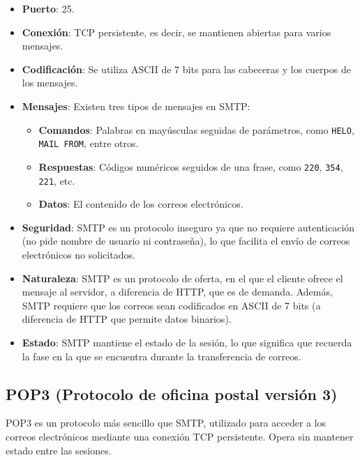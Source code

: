 \documentclass{article}
\begin{document}
\begin{itemize}
    \item \textbf{Puerto}: 25.
    \item \textbf{Conexión}: TCP persistente, es decir, se mantienen abiertas para varios mensajes.
    \item \textbf{Codificación}: Se utiliza ASCII de 7 bits para las cabeceras y los cuerpos de los mensajes.
    \item \textbf{Mensajes}: Existen tres tipos de mensajes en SMTP:
    \begin{itemize}
        \item \textbf{Comandos}: Palabras en mayúsculas seguidas de parámetros, como \texttt{HELO}, \texttt{MAIL FROM}, entre otros.
        \item \textbf{Respuestas}: Códigos numéricos seguidos de una frase, como \texttt{220}, \texttt{354}, \texttt{221}, etc.
        \item \textbf{Datos}: El contenido de los correos electrónicos.
    \end{itemize}
    \item \textbf{Seguridad}: SMTP es un protocolo inseguro ya que no requiere autenticación (no pide nombre de usuario ni contraseña), lo que facilita el envío de correos electrónicos no solicitados.
    \item \textbf{Naturaleza}: SMTP es un protocolo de oferta, en el que el cliente ofrece el mensaje al servidor, a diferencia de HTTP, que es de demanda. Además, SMTP requiere que los correos sean codificados en ASCII de 7 bits (a diferencia de HTTP que permite datos binarios).
    \item \textbf{Estado}: SMTP mantiene el estado de la sesión, lo que significa que recuerda la fase en la que se encuentra durante la transferencia de correos.
\end{itemize}

\subsection{POP3 (Protocolo de oficina postal versión 3)}
POP3 es un protocolo más sencillo que SMTP, utilizado para acceder a los correos electrónicos mediante una conexión TCP persistente. Opera sin mantener estado entre las sesiones.
\end{document}
